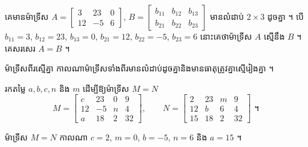 \begin{example}[ឧទាហរណ៍]
គេមានម៉ាទ្រីស $A = \begin{bmatrix} 3 & 23 & 0\\ 12 & -5 & 6 \end{bmatrix}$, $B = \begin{bmatrix} b_{11} & b_{12} & b_{13}\\ b_{21} & b_{22} & b_{23} \end{bmatrix}$ មានលំដាប់ $2 \times 3$ ដូចគ្នា ។ បើ $b_{11} = 3$, $b_{12} = 23$, $b_{13} = 0$, $b_{21} = 12$, $b_{22} = -5$, $b_{23} = 6$ នោះគេថាម៉ាទ្រីស $A$ ស្មើនឹង $B$ ។ គេសរសេរ $A = B$ ។
\end{example}

\begin{formulaBox}[ជាទូទៅ]
ម៉ាទ្រីសពីរស្មើគ្នា កាលណាម៉ាទ្រីសទាំងពីរមានលំដាប់ដូចគ្នានិងមានធាតុត្រូវគ្នាស្មើរៀងគ្នា ។
\end{formulaBox}

\begin{example}[លំហាត់គំរូ ២]
រកតម្លៃ $a, b, c, n$ និង $m$ ដើម្បីឱ្យម៉ាទ្រីស $M = N$
\[ M = \begin{bmatrix} c & 23 & 0 & 9\\ 12 & -5 & n & 4\\ a & 18 & 2 & 32 \end{bmatrix}, \qquad N = \begin{bmatrix} 2 & 23 & m & 9\\ 12 & b & 6 & 4\\ 15 & 18 & 2 & 32 \end{bmatrix} \text{ ។} \]
\end{example}
\ans
ម៉ាទ្រីស $M = N$ កាលណា $c = 2$, $m = 0$, $b = -5$, $n = 6$ និង $a = 15$ ។

